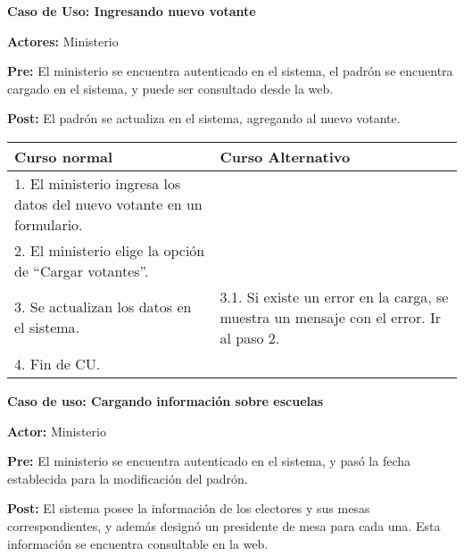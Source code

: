 \textbf{Caso de Uso: Ingresando nuevo votante}

\textbf{Actores:} Ministerio

\textbf{Pre:} El ministerio se encuentra autenticado en el sistema, el padrón se encuentra cargado en el sistema, y puede ser consultado desde la web.

\textbf{Post:} El padrón se actualiza en el sistema, agregando al nuevo votante.
\begin{table}[h!]
	
 \begin{tabular}{|p{7.5cm} | p{7.5cm}|} 
 \hline
 \textbf{Curso normal} & \textbf{Curso Alternativo} \\
 \hline

1. El ministerio ingresa los datos del nuevo votante en un formulario. & \\
\hline

2. El ministerio elige la opción de “Cargar votantes”. & \\
\hline

3. Se actualizan los datos en el sistema. & 3.1. Si existe un error en la carga, se muestra un mensaje con el error. Ir al paso 2. \\
\hline
4. Fin de CU. & \\
 \hline
 \end{tabular}

\end{table}

\textbf{Caso de uso: Cargando información sobre escuelas}

\textbf{Actor:} Ministerio

\textbf{Pre:} El ministerio se encuentra autenticado en el sistema, y pasó la fecha establecida para la modificación del padrón.

\textbf{Post:} El sistema posee la información de los electores y sus mesas correspondientes, y además designó un presidente de mesa para cada una. Esta información se encuentra consultable en la web.


